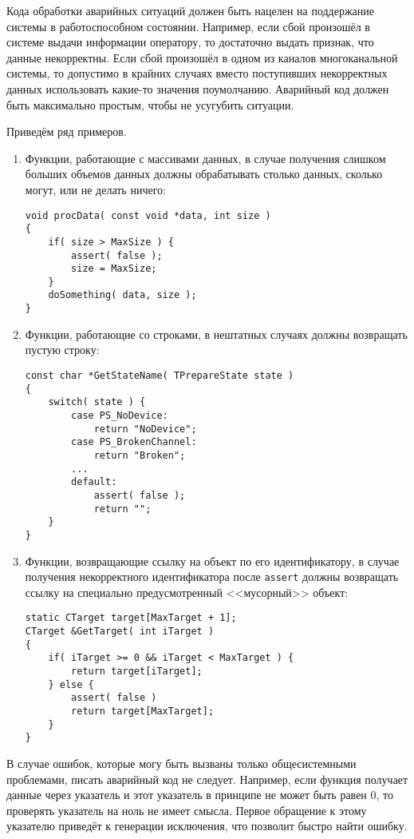 {{{Кода обработки аварийных ситуаций должен быть нацелен на поддержание системы  в работоспособном состоянии. Например, если сбой произошёл в системе выдачи информации оператору, то достаточно выдать признак, что данные некорректны. Если сбой произошёл в одном из каналов многоканальной системы, то допустимо в крайних случаях вместо поступивших некорректных данных использовать какие-то значения по\sdash умолчанию. Аварийный код должен быть максимально простым, чтобы не усугубить ситуации.

Приведём ряд примеров.
\begin{enumerate}
\item Функции, работающие с массивами данных, в случае получения слишком больших объемов данных должны обрабатывать столько данных, сколько могут, или не делать ничего:
\begin{lstlisting}[frame=single]
void procData( const void *data, int size )
{
    if( size > MaxSize ) {
        assert( false );
        size = MaxSize;
    }
    doSomething( data, size );
}
\end{lstlisting}

\item Функции, работающие со строками, в нештатных случаях должны возвращать пустую строку:
\begin{lstlisting}[frame=single]
const char *GetStateName( TPrepareState state ) 
{
    switch( state ) {
        case PS_NoDevice:
            return "NoDevice";
        case PS_BrokenChannel:
            return "Broken";
        ...
        default:
            assert( false );
            return "";
    }
}
\end{lstlisting} 

\item Функции, возвращающие ссылку на объект по его идентификатору, в случае получения некорректного идентификатора после \lstinline|assert| должны возвращать ссылку на специально предусмотренный <<мусорный>> объект:
\begin{lstlisting}[frame=single]
static CTarget target[MaxTarget + 1];
CTarget &GetTarget( int iTarget )
{
    if( iTarget >= 0 && iTarget < MaxTarget ) {
        return target[iTarget];
    } else {
        assert( false )
        return target[MaxTarget];
    }
}
\end{lstlisting} 

\end{enumerate}

В случае ошибок, которые могу быть вызваны только общесистемными проблемами, писать аварийный код не следует. Например, если функция получает данные через указатель и этот указатель в принципе не может быть равен 0, то проверять указатель на ноль не имеет смысла. Первое обращение к этому указателю приведёт к генерации исключения, что позволит быстро найти ошибку.

}}}
